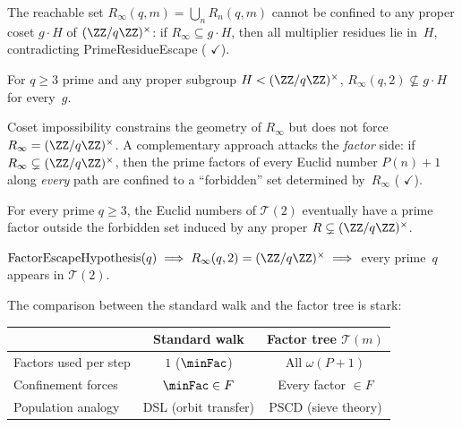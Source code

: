 The reachable set $R_\infty(q, m) = \bigcup_n R_n(q, m)$ cannot be
confined to any proper coset $g \cdot H$ of $(\ZZ/q\ZZ)^\times$:
if $R_\infty \subseteq g \cdot H$, then all multiplier residues lie
in~$H$, contradicting PrimeResidueEscape
(
{\color{leanink}$\checkmark$}).

\begin{theorem}
\label{thm:coset-impossibility}
For $q \geq 3$ prime and any proper subgroup $H < (\ZZ/q\ZZ)^\times$,
$R_\infty(q, 2) \not\subseteq g \cdot H$ for every~$g$.
\end{theorem}

\noindent
Coset impossibility constrains the geometry of $R_\infty$ but does
not force $R_\infty = (\ZZ/q\ZZ)^\times$.  A complementary approach
attacks the \emph{factor} side: if $R_\infty \subsetneq
(\ZZ/q\ZZ)^\times$, then the prime factors of every Euclid number
$P(n){+}1$ along \emph{every} path are confined to a ``forbidden''
set determined by~$R_\infty$
(
{\color{leanink}$\checkmark$}).

\begin{property}
\label{prop:factor-escape}
For every prime $q \geq 3$, the Euclid numbers of $\mathcal{T}(2)$
eventually have a prime factor outside the forbidden set induced by any
proper $R \subsetneq (\ZZ/q\ZZ)^\times$.
\end{property}

\begin{theorem}
$\mathrm{FactorEscapeHypothesis}(q) \;\Longrightarrow\;
R_\infty(q, 2) = (\ZZ/q\ZZ)^\times
\;\Longrightarrow\;$ every prime~$q$ appears in $\mathcal{T}(2)$.
\end{theorem}

\noindent
The comparison between the standard walk and the factor tree is stark:
\smallskip
\begin{center}
\begin{tabular}{@{}l@{\quad}c@{\quad}c@{}}
\toprule
 & \textbf{Standard walk} & \textbf{Factor tree} $\mathcal{T}(m)$ \\
\midrule
Factors used per step & $1$ ($\minFac$) & All $\omega(P{+}1)$ \\
Confinement forces & $\minFac \in F$ & Every factor $\in F$ \\
Population analogy & DSL (orbit transfer) & PSCD (sieve theory) \\
\bottomrule
\end{tabular}
\end{center}

